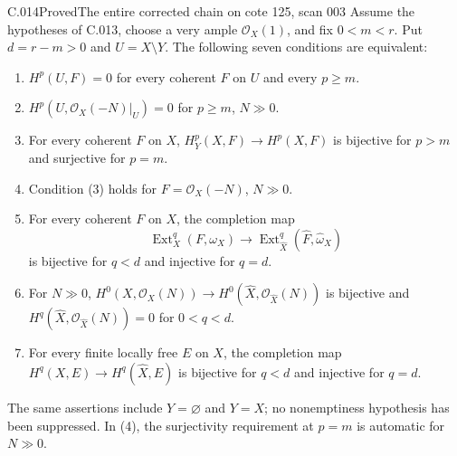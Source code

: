\begin{saresult}{C.014}{Proved}{The entire corrected chain on cote 125, scan 003}
Assume the hypotheses of C.013, choose a very ample $\mathcal O_X(1)$,
and fix $0<m<r$. Put $d=r-m>0$ and $U=X\setminus Y$.
The following seven conditions are equivalent:
\begin{enumerate}
\item $H^p(U,F)=0$ for every coherent $F$ on $U$ and every $p\geq m$.
\item $H^p(U,\mathcal O_X(-N)|_U)=0$ for $p\geq m$, $N\gg0$.
\item For every coherent $F$ on $X$, $H_Y^p(X,F)\to H^p(X,F)$ is
bijective for $p>m$ and surjective for $p=m$.
\item Condition (3) holds for $F=\mathcal O_X(-N)$, $N\gg0$.
\item For every coherent $F$ on $X$, the completion map
\[
 \operatorname{Ext}^q_X(F,\omega_X)\longrightarrow
 \operatorname{Ext}^q_{\widehat X}(\widehat F,\widehat\omega_X)
\]
is bijective for $q<d$ and injective for $q=d$.
\item For $N\gg0$, $H^0(X,\mathcal O_X(N))\to
H^0(\widehat X,\mathcal O_{\widehat X}(N))$ is bijective and
$H^q(\widehat X,\mathcal O_{\widehat X}(N))=0$ for $0<q<d$.
\item For every finite locally free $E$ on $X$, the completion map
$H^q(X,E)\to H^q(\widehat X,\widehat E)$ is bijective for $q<d$
and injective for $q=d$.
\end{enumerate}
The same assertions include $Y=\varnothing$ and $Y=X$; no nonemptiness
hypothesis has been suppressed. In (4), the surjectivity requirement at
$p=m$ is automatic for $N\gg0$.
\end{saresult}
